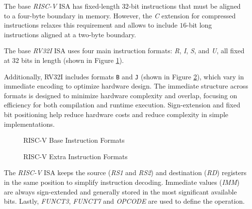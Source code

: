 The base \textit{RISC-V} ISA has fixed-length $32$-bit instructions that must be
aligned to a four-byte boundary in memory. However, the \textit{C} extension for
compressed instructions relaxes this requirement and allows to include $16$-bit long
instructions aligned at a two-byte boundary.

The base \textit{RV32I} ISA uses four main instruction formats: \textit{R}, \textit{I},
\textit{S}, and \textit{U}, all fixed at $32$ bits in length (shown in Figure
\ref{fig:instrformats}).

Additionally, RV32I includes formats \texttt{B} and \texttt{J} (shown in Figure \ref{fig:extrainstrformats}),
which vary in immediate encoding to optimize hardware design. The immediate
structure across formats is designed to minimize hardware complexity and overlap,
focusing on efficiency for both compilation and runtime execution. Sign-extension
and fixed bit positioning help reduce hardware costs and reduce complexity in
simple implementations.

\begin{figure}[htbp]
  \centering
  \def\stackalignment{r}
  {\scriptsize }
  \caption{RISC-V Base Instruction Formats}
  \label{fig:instrformats}
\end{figure}

\begin{figure}[htbp]
  \centering
  \def\stackalignment{r} %
  {\scriptsize }
  \caption{RISC-V Extra Instruction Formats}
  \label{fig:extrainstrformats}
\end{figure}

The \textit{RISC-V} ISA keeps the source (\textit{RS1} and \textit{RS2}) and destination
(\textit{RD}) registers in the same position to simplify instruction decoding. Immediate
values (\textit{IMM}) are always sign-extended and generally stored in the most
significant available bits. Lastly, \textit{FUNCT3}, \textit{FUNCT7} and \textit{OPCODE}
are used to define the operation.

